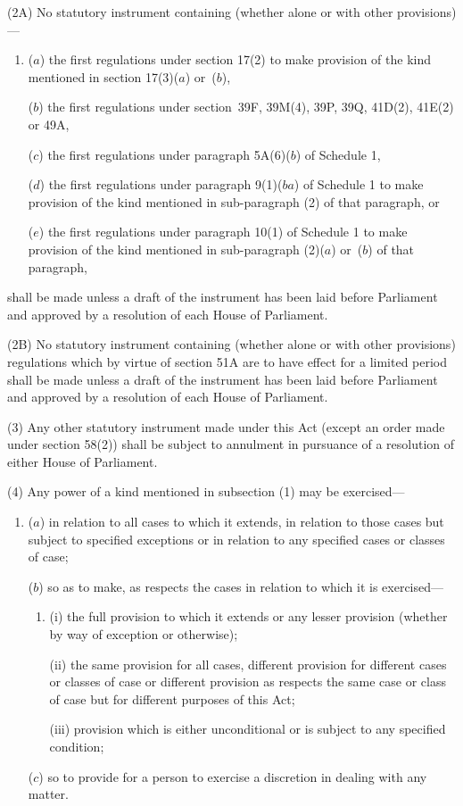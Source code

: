 \documentclass[12pt,a4paper]{article}
\begin{document}
(2A) No statutory instrument containing (whether alone or with other provisions)—
\begin{enumerate}\item[]
($a$) the first regulations under section 17(2) to make provision of the kind mentioned in section 17(3)($a$) or~($b$),

($b$) the first regulations under section~39F, 39M(4), 39P, 39Q, 41D(2), 41E(2) or 49A,

($c$) the first regulations under paragraph 5A(6)($b$) of Schedule 1,

($d$) the first regulations under paragraph 9(1)($ba$) of Schedule 1 to make provision of the kind mentioned in sub-paragraph (2) of that paragraph, or

($e$) the first regulations under paragraph 10(1) of Schedule 1 to make provision of the kind mentioned in sub-paragraph (2)($a$) or~($b$) of that paragraph,
\end{enumerate}
shall be made unless a draft of the instrument has been laid before Parliament and approved by a resolution of each House of Parliament.

(2B) No statutory instrument containing (whether alone or with other provisions) regulations which by virtue of section 51A are to have effect for a limited period shall be made unless a draft of the instrument has been laid before Parliament and approved by a resolution of each House of Parliament.

(3) Any other statutory instrument made under this Act (except an order made under section 58(2)) shall be subject to annulment in pursuance of a resolution of either House of Parliament.

(4) Any power of a kind mentioned in subsection (1)  may be exercised—
\begin{enumerate}\item[]
($a$) in relation to all cases to which it extends, in relation to those cases but subject to specified exceptions or in relation to any specified cases or classes of case;

($b$) so as to make, as respects the cases in relation to which it is exercised—
\begin{enumerate}\item[]
(i) the full provision to which it extends or any lesser provision (whether by way of exception or otherwise);

(ii) the same provision for all cases, different provision for different cases or classes of case or different provision as respects the same case or class of case but for different purposes of this Act;

(iii) provision which is either unconditional or is subject to any specified condition;
\end{enumerate}

($c$) so to provide for a person to exercise a discretion in dealing with any matter.
\end{enumerate}
\end{document}
